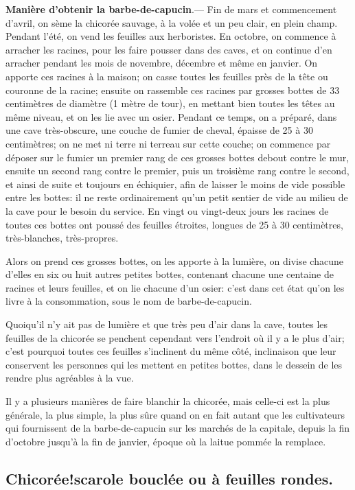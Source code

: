 \documentclass[10pt,a4paper]{book}
\begin{document}
\textbf{Manière d'obtenir la barbe-de-capucin}.--- Fin de mars et commencement d'avril, on sème la chicorée sauvage, à la volée et un peu clair, en plein champ. Pendant l'été, on vend les feuilles aux herboristes. En octobre, on commence à arracher les racines, pour les faire pousser dans des caves, et on continue d'en arracher pendant les mois de novembre, décembre et même en janvier. On apporte ces racines à la maison; on casse toutes les feuilles près de la tête ou couronne de la racine; ensuite on rassemble ces racines par grosses bottes de 33 centimètres de diamètre (1 mètre de tour), en mettant bien toutes les têtes au même niveau, et on les lie avec un osier. Pendant ce temps, on a préparé, dans une cave très-obscure, une couche de fumier de cheval, épaisse de 25 à 30 centimètres; on ne met ni terre ni terreau sur cette couche; on commence par déposer sur le fumier un premier rang de ces grosses bottes debout contre le mur, ensuite un second rang contre le premier, puis un troisième rang contre le second, et ainsi de suite et toujours en échiquier, afin de laisser le moins de vide possible entre les bottes: il ne reste ordinairement qu’un petit sentier de vide au milieu de la cave pour le besoin du service. En vingt ou vingt-deux jours les racines de toutes ces bottes ont poussé des feuilles étroites, longues de 25 à 30 centimètres, très-blanches, très-propres.

Alors on prend ces grosses bottes, on les apporte à la lumière, on divise chacune d'elles en six ou huit autres petites bottes, contenant chacune une centaine de racines et leurs feuilles, et on lie chacune d'un osier: c'est dans cet état qu'on les livre à la consommation, sous le nom de barbe-de-capucin.

Quoiqu'il n'y ait pas de lumière et que très peu d'air dans la cave, toutes les feuilles de la chicorée se penchent cependant vers l'endroit où il y a le plus d'air; c'est pourquoi toutes ces feuilles s'inclinent du même côté, inclinaison que leur conservent les personnes qui les mettent en petites bottes, dans le dessein de les rendre plus agréables à la vue.

Il y a plusieurs manières de faire blanchir la chicorée, mais celle-ci est la plus générale, la plus simple, la plus sûre quand on en fait autant que les cultivateurs qui fournissent de la barbe-de-capucin sur les marchés de la capitale, depuis la fin d'octobre jusqu'à la fin de janvier, époque où la laitue pommée la remplace.

\subsection{Chicorée!scarole bouclée ou à feuilles rondes.}
\end{document}
